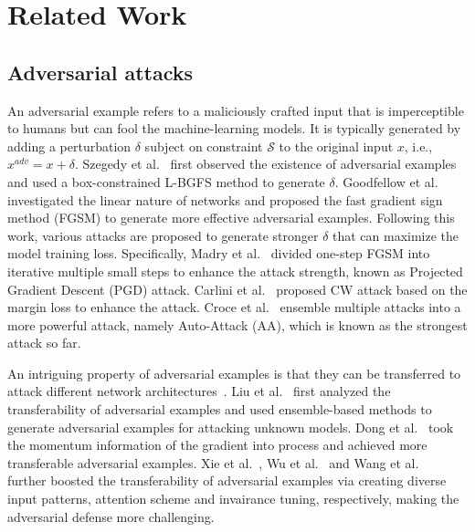 \documentclass[10pt,twocolumn,letterpaper]{article}
\begin{document}
\section{Related Work}
\subsection{Adversarial attacks}
An adversarial example refers to a maliciously crafted input that is imperceptible to humans but can fool the machine-learning models. It is typically generated by adding a perturbation $\delta$ subject on constraint $\mathcal{S}$ to the original input $x$, i.e., $x^{adv} = x+\delta$. Szegedy et al.~\cite{Szegedy} first observed the existence of adversarial examples and used a box-constrained L-BGFS method to generate $\delta$. Goodfellow et al.~\cite{Goodfellow2015} investigated the linear nature of networks and proposed the fast gradient sign method (FGSM) to generate more effective adversarial examples. Following this work, various attacks are proposed to generate stronger $\delta$ that can maximize the model training loss. Specifically, Madry et al.~\cite{madry2018towards} divided one-step FGSM into iterative multiple small steps to enhance the attack strength, known as Projected Gradient Descent (PGD) attack. Carlini et al.~\cite{cwattack} proposed CW attack based on the margin loss to enhance the attack. Croce et al.~\cite{croce2020reliable} ensemble multiple attacks into a more powerful attack, namely Auto-Attack (AA), which is known as the strongest attack so far.

An intriguing property of adversarial examples is that they can be transferred to attack different network architectures~\cite{Goodfellow2015,Szegedy2014intriguing}. Liu et al.~\cite{liu2017delving} first analyzed the transferability of adversarial examples and used ensemble-based methods to generate adversarial examples for attacking unknown models. Dong et al.~\cite{dong2018boosting} took the momentum information of the gradient into process and achieved more transferable adversarial examples. Xie et al.~\cite{Xie2019transfer}, Wu et al.~\cite{Wu_2020_CVPR} and Wang et al.~\cite{Wang_2021_transfer} further boosted the transferability of adversarial examples via creating diverse input patterns, attention scheme and invairance tuning, respectively, making the adversarial defense more challenging.
\end{document}
